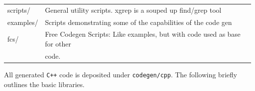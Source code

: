 \documentclass[11pt]{article}
\begin{document}
\begin{center}
\begin{tabular}{ll}
 scripts/                   &  General utility scripts. xgrep is a souped up find/grep tool                              \\
 examples/                  &  Scripts demonstrating some of the capabilities of the code gen                            \\
 fcs/                       &  Free Codegen Scripts: Like examples, but with code used as base for other                 \\
                            &  code.                                                                                     \\
\end{tabular}
\end{center}



  All generated \texttt{C++} code is deposited under \texttt{codegen/cpp}. The
  following briefly outlines the basic libraries.
\end{document}
